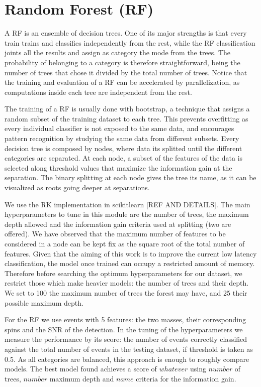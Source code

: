 \section{Random Forest (RF)}

A RF is an ensemble of decision trees. One of its major strengths is that every train trains and classifies independently from the rest, while the RF classification joints all the results and assign as category the mode from the trees. The probability of belonging to a category is therefore straightforward, being the number of trees that chose it divided by the total number of trees. Notice that the training and evaluation of a RF can be accelerated by parallelization, as computations inside each tree are independent from the rest.

The training of a RF is usually done with bootstrap, a technique that assigns a random subset of the training dataset to each tree. This prevents overfitting as every individual classifier is not exposed to the same data, and encourages pattern recognition by studying the same data from different subsets. Every decision tree is composed by nodes, where data its splitted until the different categories are separated. At each node, a subset of the features of the data is selected along threshold values that maximize the information gain at the separation. The binary splitting at each node gives the tree its name, as it can be visualized as roots going deeper at separations.

We use the RK implementation in scikitlearn [REF AND DETAILS]. The main hyperparameters to tune in this module are the number of trees, the maximum depth allowed and the information gain criteria used at splitting (two are offered). We have observed that the maximum number of features to be considered in a node can be kept fix as the square root of the total number of features. Given that the aiming of this work is to improve the current low latency classification, the model once trained can occupy a restricted amount of memory. Therefore before searching the optimum hyperparameters for our dataset, we restrict those which make heavier models: the number of trees and their depth. We set to 100 the maximum number of trees the forest may have, and 25 their possible maximum depth.

For the RF we use events with 5 features: the two masses, their corresponding spins and the SNR of the detection. In the tuning of the hyperparameters we measure the performance  by its score: the number of events correctly classified against the total number of events in the testing dataset, if threshold is taken as 0.5. As all categories are balanced, this approach is enough to roughly compare models. The best model found achieves a score of $whatever$ using $number$ of trees, $number$ maximum depth and $name$ criteria for the information gain.


